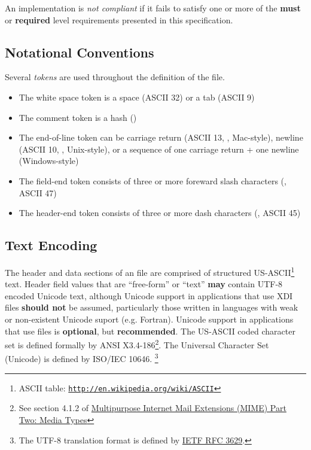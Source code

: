 \documentclass{article}
\begin{document}
An {\xdi} implementation is \textit{not compliant} if it fails to
satisfy one or more of the \textbf{must} or \textbf{required} level
requirements presented in this specification.

\subsection{Notational Conventions}
\label{sec:def_notation}


Several {\xdi} \textit{tokens} are used throughout the definition of the {\xdi} file.

\begin{itemize}
\item The white space token is a space (ASCII 32) or a tab (ASCII 9)
\item The comment token is a hash (\xditt{\#})
\item The end-of-line token can be carriage return (ASCII 13,
  , Mac-style), newline (ASCII 10, ,
  Unix-style), or a sequence of one carriage return + one newline
  (Windows-style)
\item The field-end token consists of three or more foreward slash
  characters (\xditt{/}, ASCII 47)
\item The header-end token consists of three or more dash characters
  (\xditt{-}, ASCII 45)
\end{itemize}


\subsection{Text Encoding}
\label{sec:def_encoding}

The header and data sections of an {\xdi} file are comprised of
structured US-ASCII\footnote{ASCII table:
  \href{http://en.wikipedia.org/wiki/ASCII}
  {\texttt{http://en.wikipedia.org/wiki/ASCII}}} text.  Header field
values that are ``free-form'' or ``text'' \textbf{may} contain UTF-8
encoded Unicode text, although Unicode support in applications that
use XDI files \textbf{should not} be assumed, particularly those
written in languages with weak or non-existent Unicode suport
(e.g. Fortran).  Unicode support in applications that use {\xdi} files
is \textbf{optional}, but \textbf{recommended}.  The US-ASCII coded
character set is defined formally by ANSI X3.4-186\footnote{See
  section 4.1.2 of
  \href{http://tools.ietf.org/html/rfc2046}{Multipurpose Internet Mail
    Extensions (MIME) Part Two: Media Types}}.  The Universal
Character Set (Unicode) is defined by ISO/IEC 10646. \footnote{The
  UTF-8 translation format is defined by
  \href{http://tools.ietf.org/html/rfc3629}{IETF RFC 3629}.}
\end{document}
